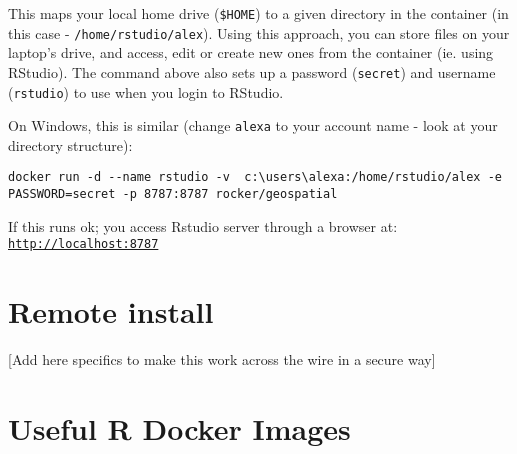 \documentclass[]{book}
\begin{document}
This maps your local home drive (\texttt{\$HOME}) to a given directory
in the container (in this case - \texttt{/home/rstudio/alex}). Using
this approach, you can store files on your laptop's drive, and access,
edit or create new ones from the container (ie. using RStudio). The
command above also sets up a password (\texttt{secret}) and username
(\texttt{rstudio}) to use when you login to RStudio.

On Windows, this is similar (change \texttt{alexa} to your account name
- look at your directory structure):

\begin{verbatim}
docker run -d --name rstudio -v  c:\users\alexa:/home/rstudio/alex -e PASSWORD=secret -p 8787:8787 rocker/geospatial
\end{verbatim}

If this runs ok; you access Rstudio server through a browser at:
\href{http://localhost:8787}{\texttt{http://localhost:8787}}

\section{Remote install}\label{remote-install-1}

{[}Add here specifics to make this work across the wire in a secure
way{]}

\section{Useful R Docker Images}\label{useful-r-docker-images}


\end{document}
